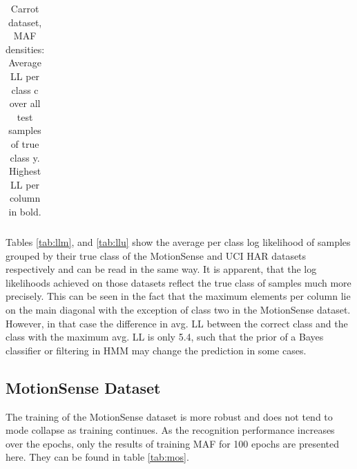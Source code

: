 \documentclass[11pt,titlepage,oneside,openany]{book}
\begin{document}
\begin{table}[H]
{\begin{tabular}{c c c c c c c c c c c c c c c c c}
		\bottomrule
	\end{tabular}
	}
	\caption[Carrot average LL]{\label{tab:llc} Carrot dataset, MAF densities: Average LL per class c over all test samples of true class y. Highest LL per column in bold.}
\end{table}

\noindent Tables \ref{tab:llm}, and \ref{tab:llu} show the average per class log likelihood of samples grouped by their true class of the MotionSense and UCI HAR datasets respectively and can be read in the same way. It is apparent, that the log likelihoods achieved on those datasets reflect the true class of samples much more precisely. This can be seen in the fact that the maximum elements per column lie on the main diagonal with the exception of class two in the MotionSense dataset. However, in that case the difference in avg. LL between the correct class and the class with the maximum avg. LL is only 5.4, such that the prior of a Bayes classifier or filtering in HMM may change the prediction in some cases.

\subsection{MotionSense Dataset}
The training of the MotionSense dataset is more robust and does not tend to mode collapse as training continues. As the recognition performance increases over the epochs, only the results of training MAF for 100 epochs are presented here. They can be found in table \ref{tab:mos}.
\end{document}
